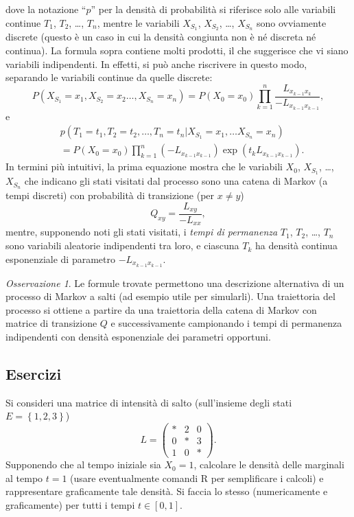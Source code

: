 \documentclass[
  italian,
  letterpaper,
]{book}
\newcommand{\bra}[1]{\left( #1 \right)}
\newcommand{\cur}[1]{\left\{ #1 \right\}}
\theoremstyle{definition}
\theoremstyle{remark}
\newtheorem*{remark}{Osservazione}
\begin{document}
dove la notazione ``\(p\)'' per la densità di probabilità si riferisce
solo alle variabili continue \(T_1\), \(T_2\), \ldots, \(T_n\), mentre
le variabili \(X_{S_1}\), \(X_{S_2}\), \ldots, \(X_{S_n}\) sono
ovviamente discrete (questo è un caso in cui la densità congiunta non è
né discreta né continua). La formula sopra contiene molti prodotti, il
che suggerisce che vi siano variabili indipendenti. In effetti, si può
anche riscrivere in questo modo, separando le variabili continue da
quelle discrete:
\[ P(X_{S_1} = x_1, X_{S_2} = x_2 \ldots,  X_{S_n} = x_n) = P(X_0 =x_0) \prod_{k=1}^n  \frac{ L_{x_{k-1} x_k}}{-L_{x_{k-1} x_{k-1}}},\]
e
\[ \begin{split} & p(T_1 = t_1,  T_2 = t_2, \ldots, T_n = t_n| X_{S_1}= x_1, \ldots  X_{S_n} = x_n) \\
& =  P(X_0 = x_0) \prod_{k=1}^n (-L_{x_{k-1}x_{k-1}}) \exp\bra{t_k L_{x_{k-1} x_{k-1}}}.\end{split}\]
In termini più intuitivi, la prima equazione mostra che le variabili
\(X_0\), \(X_{S_1}\), \ldots, \(X_{S_n}\) che indicano gli stati
visitati dal processo sono una catena di Markov (a tempi discreti) con
probabilità di transizione (per \(x\neq y\))
\[   Q_{xy} = \frac{L_{xy}}{-L_{xx}},\] mentre, supponendo noti gli
stati visitati, i \emph{tempi di permanenza} \(T_1\), \(T_2\), \ldots,
\(T_n\) sono variabili aleatorie indipendenti tra loro, e ciascuna
\(T_k\) ha densità continua esponenziale di parametro
\(-L_{x_{k-1}x_{k-1}}\).

\begin{remark}
Le formule trovate permettono una descrizione alternativa di un processo
di Markov a salti (ad esempio utile per simularli). Una traiettoria del
processo si ottiene a partire da una traiettoria della catena di Markov
con matrice di transizione \(Q\) e successivamente campionando i tempi
di permanenza indipendenti con densità esponenziale dei parametri
opportuni.
\end{remark}

\subsection{Esercizi}\label{esercizi-35}

Si consideri una matrice di intensità di salto (sull'insieme degli stati
\(E = \cur{1,2,3}\)) \[ L = \bra{ \begin{array}{lll} * & 2 & 0 \\
0 & * & 3 \\
1 & 0 & * 
\end{array}}.\] Supponendo che al tempo iniziale sia \(X_0 = 1\),
calcolare le densità delle marginali al tempo \(t=1\) (usare
eventualmente comandi R per semplificare i calcoli) e rappresentare
graficamente tale densità. Si faccia lo stesso (numericamente e
graficamente) per tutti i tempi \(t \in [0,1]\).
\end{document}
